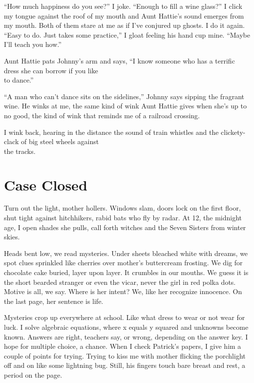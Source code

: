 \documentclass[twoside,10pt]{book}
\begin{document}
``How much happiness do you see?'' I joke. ``Enough to fill a wine
glass?'' I click my tongue against the roof of my mouth and Aunt
Hattie's sound emerges from my mouth. Both of them stare at me as if
I've conjured up ghosts. I do it again. ``Easy to do. Just takes some
practice,'' I gloat feeling his hand cup mine. ``Maybe I'll teach you
how.''

Aunt Hattie pats Johnny's arm and says, ``I know someone who has a
terrific dress she can bor­row if you like\\
to dance.''

``A man who can't dance sits on the sidelines,'' Johnny says sipping the
fragrant wine. He winks at me, the same kind of wink Aunt Hattie gives
when she's up to no good, the kind of wink that reminds me of a railroad
crossing.

I wink back, hearing in the distance the sound of train whistles and the
clickety-clack of big steel wheels against\\
the tracks.


\cleardoublepage
\chapter{Case Closed}

Turn out the light, mother hollers. Windows slam, doors lock on the
first floor, shut tight against hitchhikers, rabid bats who fly by
radar. At 12, the midnight age, I open shades she pulls, call forth
witches and the Seven Sisters from winter skies.

Heads bent low, we read mysteries. Under sheets bleached white with
dreams, we spot clues sprinkled like cherries over mother's buttercream
frosting. We dig for chocolate cake buried, layer upon layer. It
crumbles in our mouths. We guess it is the short bearded stranger or
even the vicar, never the girl in red polka dots. Motive is all, we say.
Where is her intent? We, like her recognize innocence. On the last page,
her sentence is life.

Mysteries crop up everywhere at school. Like what dress to wear or not
wear for luck. I solve algebraic equations, where x equals y squared and
unknowns become known. Answers are right, teachers say, or wrong,
depending on the answer key. I hope for multiple choice, a chance. When
I check Patrick's papers, I give him a couple of points for trying.
Trying to kiss me with mother flicking the porchlight off and on like
some lightning bug. Still, his fingers touch bare breast and rest, a
period on the page.
\end{document}
